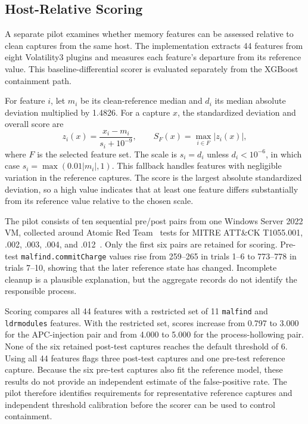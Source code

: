 \documentclass[conference]{IEEEtran}
\begin{document}
\subsection{Host-Relative Scoring}
A separate pilot examines whether memory features can be assessed relative
to clean captures from the same host. The implementation extracts 44 features
from eight Volatility3 plugins and measures each feature's departure from
its reference value. This baseline-differential scorer is evaluated
separately from the XGBoost containment path.

For feature $i$, let $m_i$ be its clean-reference median and $d_i$ its median
absolute deviation multiplied by 1.4826. For a capture $x$, the standardized
deviation and overall score are
\begin{equation}
z_i(x)=\frac{x_i-m_i}{s_i+10^{-9}},\qquad
S_F(x)=\max_{i\in F}|z_i(x)|,
\end{equation}
where $F$ is the selected feature set. The scale is $s_i=d_i$ unless
$d_i<10^{-6}$, in which case $s_i=\max(0.01|m_i|,1)$. This fallback handles
features with negligible variation in the reference captures. The score is
the largest absolute standardized deviation, so a high value indicates that
at least one feature differs substantially from its reference value relative
to the chosen scale.

The pilot consists of ten sequential pre/post pairs from one Windows Server
2022 VM, collected around Atomic Red Team~\cite{atomicredteam} tests for
MITRE ATT\&CK T1055.001, .002, .003, .004, and .012~\cite{mitre1055}.
Only the first six pairs are retained for scoring. Pre-test
\texttt{malfind.commitCharge} values rise from 259--265 in trials 1--6 to
773--778 in trials 7--10, showing that the later reference state has changed.
Incomplete cleanup is a plausible explanation, but the aggregate records
do not identify the responsible process.

Scoring compares all 44 features with a restricted set of 11
\texttt{malfind} and \texttt{ldrmodules} features. With the restricted set,
scores increase from 0.797 to 3.000 for the APC-injection pair and from
4.000 to 5.000 for the process-hollowing pair. None of the six retained
post-test captures reaches the default threshold of 6. Using all 44
features flags three post-test captures and one pre-test reference capture.
Because the six pre-test captures also fit the reference model, these
results do not provide an independent estimate of the false-positive rate.
The pilot therefore identifies requirements for representative reference
captures and independent threshold calibration before the scorer can be
used to control containment.
\end{document}
